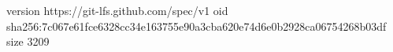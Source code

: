 version https://git-lfs.github.com/spec/v1
oid sha256:7c067e61fce6328cc34e163755e90a3cba620e74d6e0b2928ca06754268b03df
size 3209

